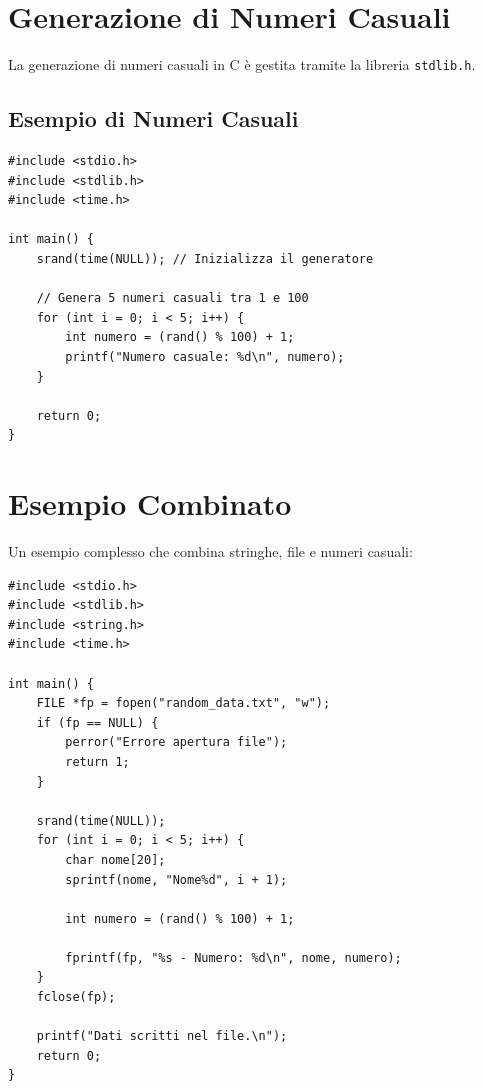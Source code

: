 \documentclass[a4paper,12pt]{article}
\begin{document}
\section{Generazione di Numeri Casuali}
La generazione di numeri casuali in C è gestita tramite la libreria \texttt{stdlib.h}.

\subsection{Esempio di Numeri Casuali}
\begin{lstlisting}[caption={Generazione di numeri casuali tra 1 e 100}]
#include <stdio.h>
#include <stdlib.h>
#include <time.h>

int main() {
    srand(time(NULL)); // Inizializza il generatore

    // Genera 5 numeri casuali tra 1 e 100
    for (int i = 0; i < 5; i++) {
        int numero = (rand() % 100) + 1;
        printf("Numero casuale: %d\n", numero);
    }

    return 0;
}
\end{lstlisting}

\section{Esempio Combinato}
Un esempio complesso che combina stringhe, file e numeri casuali:
\begin{lstlisting}[caption={Esempio combinato con stringhe, file e random}]
#include <stdio.h>
#include <stdlib.h>
#include <string.h>
#include <time.h>

int main() {
    FILE *fp = fopen("random_data.txt", "w");
    if (fp == NULL) {
        perror("Errore apertura file");
        return 1;
    }

    srand(time(NULL));
    for (int i = 0; i < 5; i++) {
        char nome[20];
        sprintf(nome, "Nome%d", i + 1);

        int numero = (rand() % 100) + 1;

        fprintf(fp, "%s - Numero: %d\n", nome, numero);
    }
    fclose(fp);

    printf("Dati scritti nel file.\n");
    return 0;
}
\end{lstlisting}
\end{document}
